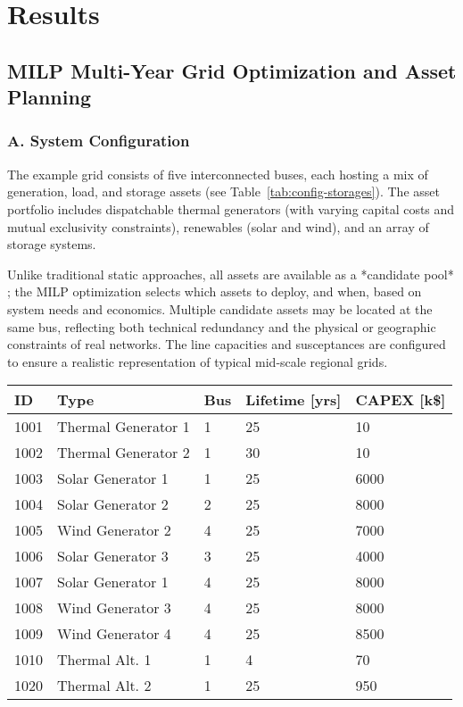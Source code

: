 \newpage
\section{Results}

\subsection{MILP Multi-Year Grid Optimization and Asset Planning}

\subsubsection*{A. System Configuration}
The example grid consists of five interconnected buses, each hosting a mix of generation, load, 
and storage assets (see Table~\ref{tab:config-storages}). The asset portfolio includes 
dispatchable thermal generators (with varying capital costs and mutual exclusivity constraints), 
renewables (solar and wind), and an array of storage systems. 

Unlike traditional static approaches, all assets are available as a *candidate pool* ; the MILP 
optimization selects which assets to deploy, and when, based on system needs and economics. 
Multiple candidate assets may be located at the same bus, reflecting both technical redundancy 
and the physical or geographic constraints of real networks. The line capacities and susceptances 
are configured to ensure a realistic representation of typical mid-scale regional grids.

\begin{table}[h]
    \centering
    \begin{tabular}{p{1.5cm} p{3.5cm} p{1.5cm} p{2.5cm} p{2.5cm}}
    \textbf{ID} & \textbf{Type} & \textbf{Bus} & \textbf{Lifetime [yrs]} & \textbf{CAPEX [k\$]} \\
    \hline
    1001 & Thermal Generator 1 & 1 & 25 & 10 \\
    1002 & Thermal Generator 2 & 1 & 30 & 10 \\
    1003 & Solar Generator 1 & 1 & 25 & 6000 \\
    1004 & Solar Generator 2 & 2 & 25 & 8000 \\
    1005 & Wind Generator 2 & 4 & 25 & 7000 \\
    1006 & Solar Generator 3 & 3 & 25 & 4000 \\
    1007 & Solar Generator 1 & 4 & 25 & 8000 \\
    1008 & Wind Generator 3 & 4 & 25 & 8000 \\
    1009 & Wind Generator 4 & 4 & 25 & 8500 \\
    1010 & Thermal Alt. 1 & 1 & 4 & 70 \\
    1020 & Thermal Alt. 2 & 1 & 25 & 950 \\
    \end{tabular}
\end{table}

